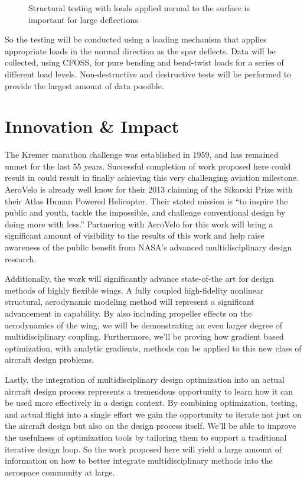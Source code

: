 \documentclass[]{aiaa-tc}
\begin{document}
        \begin{figure}
            [INSERT CARTOON HERE]
            \caption{Structural testing with loads applied normal to the surface is important for large deflections}
        \end{figure}

        So the testing will be conducted using a loading mechanism that applies appropriate loads in the normal direction
        as the spar deflects. Data will be collected, using CFOSS, for pure bending and bend-twist loads for a series of different 
        load levels. Non-destructive and destructive tests will be performed to provide the largest amount of data possible. 



    



  \section{Innovation \& Impact}

    The Kremer marathon challenge was established in 1959, and has remained unmet for the last 55 years. 
    Successful completion of work proposed here could result in could result in finally achieving this very challenging
    aviation milestone. AeroVelo is already well know for their 2013 claiming of the Sikorski Prize with their Atlas 
    Human Powered Helicopter. Their stated mission is ``to inspire the public and youth, tackle the impossible, and 
    challenge conventional design by doing more with less.'' Partnering with AeroVelo for this work will bring a significant
    amount of visibility to the results of this work and help raise awareness of the public benefit from NASA's advanced 
    multidisciplinary design research. 

    Additionally, the work will significantly advance state-of-the art for design methods of highly flexible wings. 
    A fully coupled high-fidelity nonlinear structural, aerodynamic modeling method will represent a significant advancement 
    in capability. By also including propeller effects on the aerodynamics of the wing, we will be demonstrating an even larger 
    degree of multidisciplinary coupling. Furthermore, we'll be proving how gradient based optimization, with analytic gradients, 
    methods can be applied to this new class of aircraft design problems. 

    Lastly, the integration of multidisciplinary design optimization into an actual aircraft design process represents
    a tremendous opportunity to learn how it can be used more effectively in a design context. By combining optimization, 
    testing, and actual flight into a single effort we gain the opportunity to iterate not just on the aircraft 
    design but also on the design process itself. We'll be able to improve the usefulness of optimization tools by 
    tailoring them to support a traditional iterative design loop. So the work proposed here will yield a large amount 
    of information on how to better integrate multidisciplinary methods into the aerospace community at large. 
\end{document}
